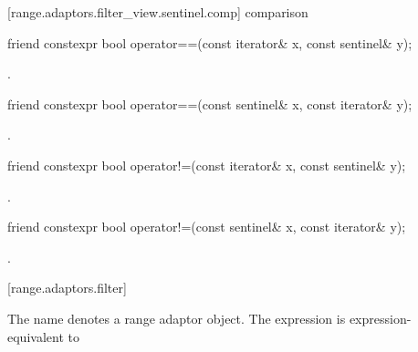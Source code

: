 \begin{itemdescr}
\pnum
\oldtxt{\returns}  
\end{itemdescr}

[range.adaptors.filter_view.sentinel.comp]{ comparison}

%
\begin{itemdecl}
friend constexpr bool operator==(const iterator& x, const sentinel& y);
\end{itemdecl}

\begin{itemdescr}
\pnum
\returns {}.
\end{itemdescr}

%
\begin{itemdecl}
friend constexpr bool operator==(const sentinel& x, const iterator& y);
\end{itemdecl}

\begin{itemdescr}
\pnum
\returns {}.
\end{itemdescr}

%
\begin{itemdecl}
friend constexpr bool operator!=(const iterator& x, const sentinel& y);
\end{itemdecl}

\begin{itemdescr}
\pnum
\returns {}.
\end{itemdescr}

%
\begin{itemdecl}
friend constexpr bool operator!=(const sentinel& x, const iterator& y);
\end{itemdecl}

\begin{itemdescr}
\pnum
\returns {}.
\end{itemdescr}


[range.adaptors.filter]{}

\pnum
The name  denotes a range adaptor
object.  The expression
 
is expression-equivalent to  


